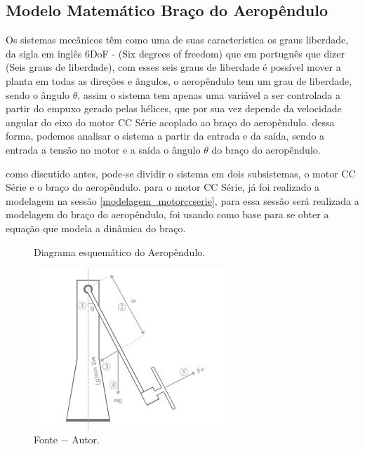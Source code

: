 \vspace{1cm}

\subsection{ Modelo Matemático Braço do Aeropêndulo}
\label{modelagem_braco_aeropendulo}

Os sistemas mecânicos têm como uma de suas característica os graus liberdade, da sigla em inglês 6DoF - (Six degrees of freedom) que em português que dizer (Seis graus de liberdade), com esses seis graus de liberdade é possível mover a planta em todas as direções e ângulos, o aeropêndulo tem um grau de liberdade, sendo o ângulo $\theta$, assim o sistema tem apenas uma variável a ser controlada a partir do empuxo gerado pelas hélices, que por sua vez depende da velocidade angular do eixo do motor CC Série acoplado ao braço do aeropêndulo. dessa forma, podemos analisar o sistema a partir da entrada e da saída, sendo a entrada a tensão no motor e a saída o ângulo $\theta$ do braço do aeropêndulo.

como discutido antes, pode-se dividir o sistema em dois subsistemas, o motor CC Série e o braço do aeropêndulo. para o motor CC Série, já foi realizado a modelagem na sessão \ref{modelagem_motorccserie}, para essa sessão será realizada a modelagem do braço do aeropêndulo, \cite{amin} foi usando como base para se obter a equação que modela a dinâmica do braço.

\begin{figure}[!h]
	\centering
	\caption{Diagrama esquemático do Aeropêndulo.}
	\includegraphics[width=0.65\textwidth]{Capitulos/4_desenvolvimento/4_figuras/desenho_aeropendulo.pdf}
	\caption*{Fonte $-$ Autor.}
        \label{fig4:image_04}
\end{figure}


